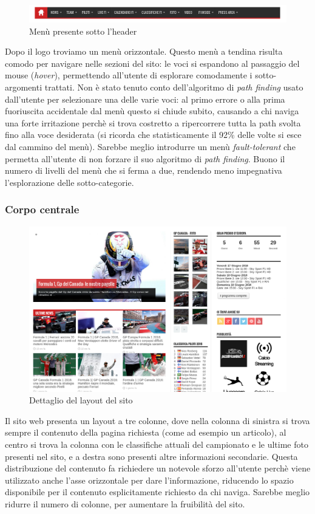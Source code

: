 \begin{figure}[H]
  \centering
  \includegraphics[scale=0.3]{top_menu}
  \caption{Menù presente sotto l'header}
\end{figure}
Dopo il logo troviamo un men\`u orizzontale. Questo men\`u a tendina risulta
comodo per navigare nelle sezioni del sito: le voci si espandono al passaggio
del mouse (\textit{hover}), permettendo all'utente di esplorare comodamente i
sotto-argomenti trattati. Non \`e stato tenuto conto dell'algoritmo di
\textit{path finding} usato dall'utente per selezionare una delle varie voci: al
primo errore o alla prima fuoriuscita accidentale dal men\`u questo si chiude
subito, causando a chi naviga una forte irritazione perch\`e si trova
costretto a ripercorrere tutta la path svolta fino alla voce desiderata (si
ricorda che statisticamente il 92\% delle volte si esce dal cammino del men\`u).
Sarebbe meglio introdurre un men\`u \textit{fault-tolerant} che permetta
all'utente di non forzare il suo algoritmo di \textit{path finding}. Buono il
numero di livelli del men\`u che si ferma a due, rendendo meno impegnativa
l'esplorazione delle sotto-categorie.

\subsubsection{Corpo centrale}


\begin{figure}[H]
  \centering
  \includegraphics[scale=0.2]{layout}
  \caption{Dettaglio del layout del sito}
\end{figure}
Il sito web presenta un layout a tre colonne, dove nella colonna di sinistra si
trova sempre il contenuto della pagina richiesta (come ad esempio un articolo),
al centro si trova la colonna con le classifiche attuali del campionato e le
ultime foto presenti nel sito, e a destra sono presenti altre informazioni
secondarie. Questa distribuzione del contenuto fa richiedere un notevole sforzo
all'utente perch\`e viene utilizzato anche l'asse orizzontale per dare
l'informazione, riducendo lo spazio disponibile per il contenuto esplicitamente
richiesto da chi naviga. Sarebbe meglio ridurre il numero di colonne, per
aumentare la fruibilit\`a del sito.

